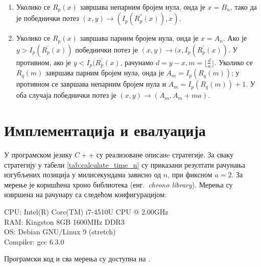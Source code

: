 \documentclass[a4paper]{article}
\begin{document}
\begin{enumerate}
	\item \label{item:neparne_nule} Уколико се $ R_{p}(x) $ завршава непарним бројем нула, онда је $ x = B_{n} $, тако да је победнички потез $ (x, y) \rightarrow (I_{p}(R^{''}_{p}(x)), x) $.
	\item \label{item:parne_nule} Уколико се $ R_{p}(x) $ завршава парним бројем нула, онда је $ x = A_{n} $. Ако је $ y > I_{p}(R^{'}_{p}(x)) $ победнички потез је $ (x, y) \rightarrow (x, I_{p}(R^{'}_{p}(x)) $. У противном, ако је $ y < I_{p}(R^{'}_{p}(x) $, рачунамо $ d = y - x, m = \lfloor \frac{d}{a} \rfloor $. Уколико се $ R_{q}(m) $ завршава парним бројем нула, онда је $ A_{m} = I_{p}(R_{q}(m)) $; у противном се завршава непарним бројем нула и $ A_{m} = I_{p}(R_{q}(m)) + 1 $. У оба случаја победнички потез је $ (x, y) \rightarrow (A_{m}, A_{m} + ma) $.
\end{enumerate}

\section{Имплементација и евалуација}
\label{sec:implementacija_evaluacija}

У програмском језику $ C++ $ су реализоване описанe стратегије. За сваку стратегију у табели \ref{tab:calculate_time_n} су приказани резултати рачунања изгубљених позиција у милисекундама зависно од $ n $, при фиксном $ a = 2 $. 
За мерење је коришћена хроно библиотека (енг.{~\em chrono library}). Мерења су извршена на рачунару са следећом конфигурацијом:
\begin{flushleft}
	CPU: Intel(R) Core(TM) i7-4510U CPU @ 2.00GHz\\
	RAM: Kingston 8GB 1600MHz DDR3\\
	OS: Debian GNU/Linux 9 (stretch)\\
	Compiler: gcc 6.3.0\\
\end{flushleft}

Програмски код и сва мерења су доступна на \cite{marija_mijailovic_2020_4035942}.

\end{document}
